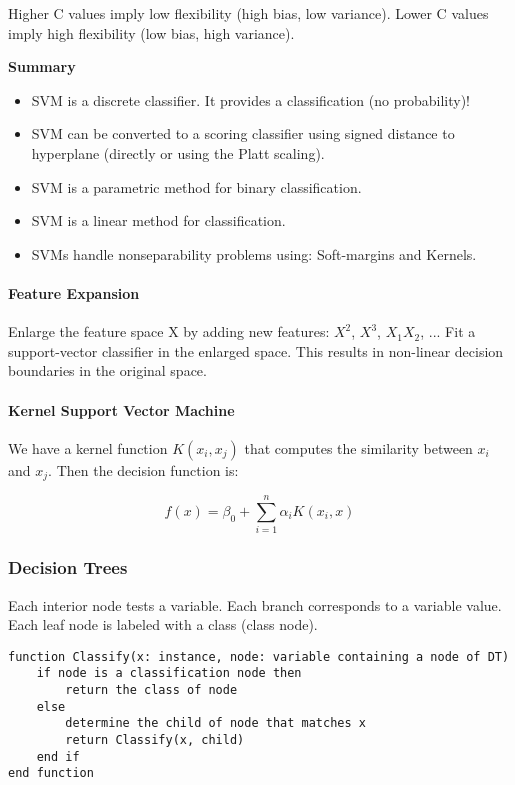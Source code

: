 Higher C values imply low flexibility (high bias, low variance).
Lower C values imply high flexibility (low bias, high variance).

\textbf{Summary}
\begin{itemize}[noitemsep]
    \item SVM is a discrete classifier. It provides a classification (no probability)!\
    \item SVM can be converted to a scoring classifier using signed distance to hyperplane (directly or using the Platt scaling).
    \item SVM is a parametric method for binary classification.
    \item SVM is a linear method for classification.
    \item SVMs handle nonseparability problems using: Soft-margins and Kernels.
\end{itemize}

\paragraph{Feature Expansion}
Enlarge the feature space X by adding new features: $X^2$, $X^3$, $X_1 X_2$, ...
Fit a support-vector classifier in the enlarged space. This results in non-linear decision boundaries in the original space.

\paragraph{Kernel Support Vector Machine}
We have a kernel function $K(x_i, x_j)$ that computes the similarity between $x_i$ and $x_j$. Then the decision function is:

$$f(x) = \beta_0 + \sum_{i=1}^n \alpha_i K(x_i, x)$$

\subsubsection*{Decision Trees}
Each interior node tests a variable. Each branch corresponds to a variable value. Each leaf node is labeled with a class (class node).

\begin{verbatim}
function Classify(x: instance, node: variable containing a node of DT)
    if node is a classification node then
        return the class of node
    else
        determine the child of node that matches x
        return Classify(x, child)
    end if
end function
\end{verbatim}

